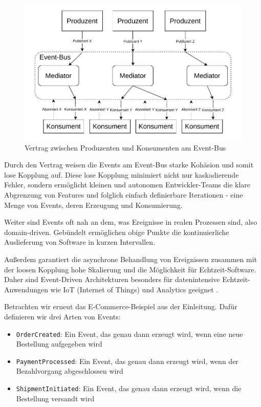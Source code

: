 \documentclass[acmtog]{acmart}
\begin{document}
\begin{figure}[!h]
  \centering
  \includegraphics[width=\linewidth]{images/eda/eda.drawio}
  \caption{Vertrag zwischen Produzenten und Konsumenten am Event-Bus}
  \label{fig:eda}
\end{figure}

Durch den Vertrag weisen die Events am Event-Bus starke Kohäsion und somit lose Kopplung auf.
Diese lose Kopplung minimiert nicht nur kaskadierende Fehler, sondern ermöglicht kleinen und autonomen Entwickler-Teams
die klare Abgrenzung von Features und folglich einfach definierbare Iterationen - eine Menge von Events, deren Erzeugung und Konsumierung.

Weiter sind Events oft nah an dem, was Ereignisse in realen Prozessen sind, also domain-driven.
Gebündelt ermöglichen obige Punkte die kontinuierliche Auslieferung von Software in kurzen Intervallen.

Außerdem garantiert die asynchrone Behandlung von Ereignissen zusammen mit der loosen Kopplung hohe Skalierung und die Möglichkeit für Echtzeit-Software.
Daher sind Event-Driven Architekturen besonders für datenintensive Echtzeit-Anwendungen wie IoT (Internet of Things) und Analytics geeignet \cite{iotEda}.

Betrachten wir erneut das E-Commerce-Beispiel aus der Einleitung.
Dafür definieren wir drei Arten von Events:
\begin{itemize}
  \item \texttt{OrderCreated}: Ein Event, das genau dann erzeugt wird, wenn eine neue Bestellung aufgegeben wird
  \item \texttt{PaymentProcessed}: Ein Event, das genau dann erzeugt wird, wenn der Bezahlvorgang abgeschlossen wird
  \item \texttt{ShipmentInitiated}: Ein Event, das genau dann erzeugt wird, wenn die Bestellung versandt wird
\end{itemize}
\end{document}
